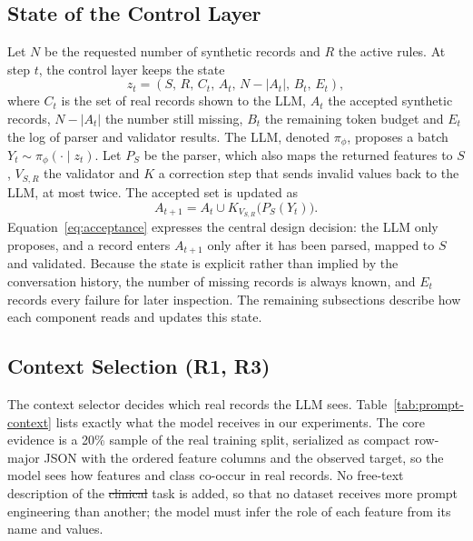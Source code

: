 \documentclass[conference]{IEEEtran}
\providecommand{\DIFaddtex}[1]{{\protect\color{blue}\uwave{#1}}} %
\providecommand{\DIFdeltex}[1]{{\protect\color{red}\sout{#1}}}                      %
\providecommand{\DIFaddbegin}{} %
\providecommand{\DIFaddend}{} %
\providecommand{\DIFdelbegin}{} %
\providecommand{\DIFdelend}{} %
\providecommand{\DIFadd}[1]{\texorpdfstring{\DIFaddtex{#1}}{#1}} %
\providecommand{\DIFdel}[1]{\texorpdfstring{\DIFdeltex{#1}}{}} %
\newcommand{\DIFscaledelfig}{0.5}
\newlength{\DIFdelgraphicswidth} %
\newlength{\DIFdelgraphicsheight} %
\newcommand{\DIFaddincludegraphics}[2][]{{\color{blue}\fbox{\DIFOincludegraphics[#1]{#2}}}} %
\newcommand{\DIFdelincludegraphics}[2][]{%
\sbox{\DIFdelgraphicsbox}{\DIFOincludegraphics[#1]{#2}}%
\settoboxwidth{\DIFdelgraphicswidth}{\DIFdelgraphicsbox} %
\settoboxtotalheight{\DIFdelgraphicsheight}{\DIFdelgraphicsbox} %
\scalebox{\DIFscaledelfig}{%
\parbox[b]{\DIFdelgraphicswidth}{\usebox{\DIFdelgraphicsbox}\\[-\baselineskip] \rule{\DIFdelgraphicswidth}{0em}}\llap{\resizebox{\DIFdelgraphicswidth}{\DIFdelgraphicsheight}{%
\setlength{\unitlength}{\DIFdelgraphicswidth}%
\begin{picture}(1,1)%
\thicklines\linethickness{2pt} %
{\color[rgb]{1,0,0}\put(0,0){\framebox(1,1){}}}%
{\color[rgb]{1,0,0}\put(0,0){\line( 1,1){1}}}%
{\color[rgb]{1,0,0}\put(0,1){\line(1,-1){1}}}%
\end{picture}%
}\hspace*{3pt}}} %
} %
\DeclareRobustCommand{\DIFaddbegin}{\DIFOaddbegin \let\includegraphics\DIFaddincludegraphics} %
\DeclareRobustCommand{\DIFaddend}{\DIFOaddend \let\includegraphics\DIFOincludegraphics} %
\DeclareRobustCommand{\DIFdelbegin}{\DIFOdelbegin \let\includegraphics\DIFdelincludegraphics} %
\DeclareRobustCommand{\DIFdelend}{\DIFOaddend \let\includegraphics\DIFOincludegraphics} %
\begin{document}
\subsection{State of the Control Layer}
Let $N$ be the requested number of synthetic records and $R$ the active rules. At step $t$, the control layer keeps the state
\begin{equation}
z_t=(S,\,R,\,C_t,\,A_t,\,N-|A_t|,\,B_t,\,E_t),
\label{eq:state}
\end{equation}
where $C_t$ is the set of real records shown to the LLM, $A_t$ the accepted synthetic records, $N-|A_t|$ the number still missing, $B_t$ the remaining token budget and $E_t$ the log of parser and validator results. The LLM, denoted $\pi_{\phi}$, proposes a batch $Y_t\sim\pi_{\phi}(\cdot\mid z_t)$. Let $P_S$ be the parser, which also maps the returned features to $S$, $V_{S,R}$ the validator and $K$ a correction step that sends invalid values back to the LLM, at most twice. The accepted set is updated as
\begin{equation}
A_{t+1}=A_t\cup K_{V_{S,R}}\bigl(P_S(Y_t)\bigr).
\label{eq:acceptance}
\end{equation}
Equation~\eqref{eq:acceptance} expresses the central design decision: the LLM only proposes, and a record enters $A_{t+1}$ only after it has been parsed, mapped to $S$ and validated. Because the state is explicit rather than implied by the conversation history, the number of missing records is always known, and $E_t$ records every failure for later inspection. The remaining subsections describe how each component reads and updates this state.

\subsection{Context Selection (R1, R3)}
The context selector decides which real records the LLM sees. Table~\ref{tab:prompt-context} lists exactly what the model receives in our experiments. The core evidence is a 20\% sample of the real training split, serialized as compact row-major JSON with the ordered feature columns and the observed target, so the model sees how features and class co-occur in real records. No free-text description of the \DIFdelbegin \DIFdel{clinical }\DIFdelend \DIFaddbegin \DIFadd{prediction }\DIFaddend task is added, so that no dataset receives more prompt engineering than another; the model must infer the role of each feature from its name and values.
\end{document}
